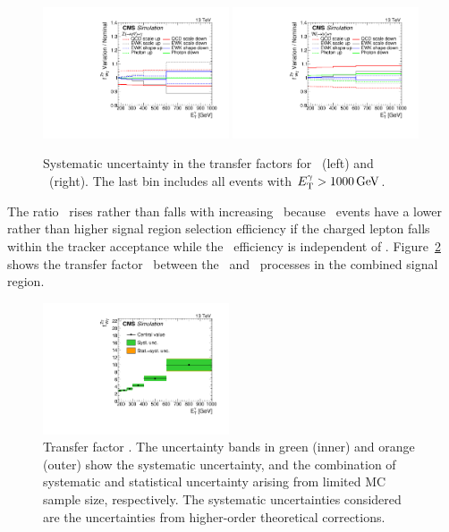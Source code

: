 \begin{figure}[htbp]
  \centering
    \includegraphics[width=0.49\textwidth]{Analysis/Figures/tf_syst_zg.pdf}
    \includegraphics[width=0.49\textwidth]{Analysis/Figures/tf_syst_wg.pdf}
    \caption{
      Systematic uncertainty in the transfer factors for \zinvg\ (left) and \wlng\ (right). The last bin includes all events with $E_{\mathrm{T}}^{\gamma} > 1000\,\text{Ge\hspace{-.08em}V}$.
    }
    \label{fig:tf_syst}
\end{figure}

The ratio \fZW\ rises rather than falls with increasing \ETg\ because \wlng\ events have a lower rather than higher signal region selection efficiency if the charged lepton falls within the tracker acceptance while the \zinvg\ efficiency is independent of \ETg. Figure~\ref{fig:tf_wz} shows the transfer factor \fZW\ between the \zinvg\ and \wlng\ processes in the combined signal region.


\begin{figure}[htbp]
  \centering
    \includegraphics[width=0.49\textwidth]{Analysis/Figures/fZW.pdf}
    \caption{
      Transfer factor \fZW. 
      The uncertainty bands in green (inner) and orange (outer) show the systematic uncertainty, and the combination of systematic and statistical uncertainty arising from limited MC sample size, respectively. 
      The systematic uncertainties considered are the uncertainties from higher-order theoretical corrections.
    }
    \label{fig:tf_wz}
\end{figure}

